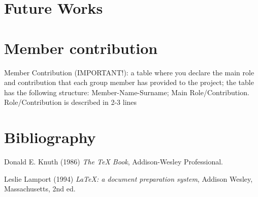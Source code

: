\documentclass{article}
\begin{document}
    \section{Future Works}
    \newpage

    \section{Member contribution}
    Member Contribution (IMPORTANT!): a table where you declare the main role and contribution
    that each group member has provided to the project; the table has the following structure:
    Member-Name-Surname; Main Role/Contribution. Role/Contribution is described in 2-3 lines
    \newpage

    \section{Bibliography}
    \begin{thebibliography}{9}
        Donald E. Knuth (1986) \emph{The \TeX{} Book}, Addison-Wesley Professional.

        Leslie Lamport (1994) \emph{\LaTeX: a document preparation system}, Addison
        Wesley, Massachusetts, 2nd ed.
    \end{thebibliography}
    \newpage
\end{document}
